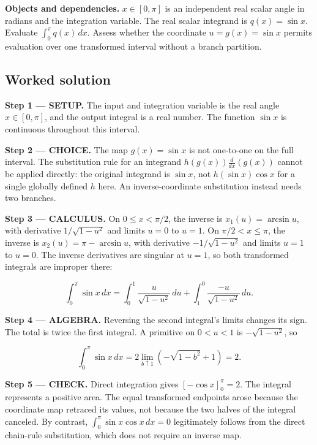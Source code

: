 \documentclass[11pt,oneside,openany]{book}
\begin{document}
\textbf{Objects and dependencies.} \(x\in[0,\pi]\) is an independent real scalar angle in radians and the integration variable. The real scalar integrand is \(q(x)=\sin x\). Evaluate \(\int_0^\pi q(x)\,dx\). Assess whether the coordinate \(u=g(x)=\sin x\) permits evaluation over one transformed interval without a branch partition.
\subsection*{Worked solution}

\textbf{Step 1 --- SETUP.} The input and integration variable is the real angle \(x\in[0,\pi]\), and the output integral is a real number. The function \(\sin x\) is continuous throughout this interval.

\begin{ChoiceStep}
\textbf{Step 2 --- CHOICE.} The map \(g(x)=\sin x\) is not one-to-one on the full interval. The substitution rule for an integrand \(h(g(x))\frac{d}{dx}(g(x))\) cannot be applied directly: the original integrand is \(\sin x\), not \(h(\sin x)\cos x\) for a single globally defined \(h\) here. An inverse-coordinate substitution instead needs two branches.

\end{ChoiceStep}
\textbf{Step 3 --- CALCULUS.} On \(0\le x<\pi/2\), the inverse is \(x_1(u)=\arcsin u\), with derivative \(1/\sqrt{1-u^2}\) and limits \(u=0\) to \(u=1\). On \(\pi/2<x\le\pi\), the inverse is \(x_2(u)=\pi-\arcsin u\), with derivative \(-1/\sqrt{1-u^2}\) and limits \(u=1\) to \(u=0\). The inverse derivatives are singular at \(u=1\), so both transformed integrals are improper there:

\[
\int_0^\pi\sin x\,dx
=\int_0^1\frac{u}{\sqrt{1-u^2}}\,du
+\int_1^0\frac{-u}{\sqrt{1-u^2}}\,du.
\]

\begingroup\color{AlgebraBlue}
\textbf{Step 4 --- ALGEBRA.} Reversing the second integral's limits changes its sign. The total is twice the first integral. A primitive on \(0<u<1\) is \(-\sqrt{1-u^2}\), so

\[
\int_0^\pi\sin x\,dx
=2\lim_{b\uparrow1}\left(-\sqrt{1-b^2}+1\right)=2.
\]

\endgroup
\textbf{Step 5 --- CHECK.} Direct integration gives \([-\cos x]_0^\pi=2\). The integral represents a positive area. The equal transformed endpoints arose because the coordinate map retraced its values, not because the two halves of the integral canceled. By contrast, \(\int_0^\pi\sin x\cos x\,dx=0\) legitimately follows from the direct chain-rule substitution, which does not require an inverse map.
\end{document}
